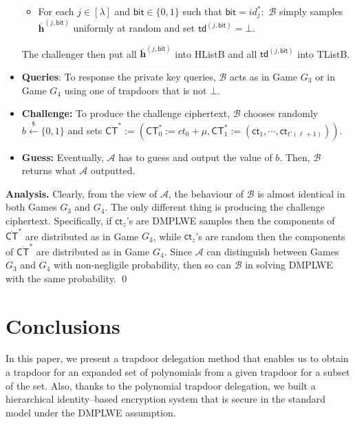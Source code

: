 \documentclass[runningheads]{llncs}
\begin{document}
\begin{itemize}
\begin{itemize}
\item For each $j \in [\lambda]$ and $\textsf{bit}\in\{0,1\}$ such that $\textsf{bit} =  id^*_j:$ $\mathcal{B}$ simply samples $ \overline{\textbf{h}}^{(j,\mathsf{bit})}$ uniformly at random and set $\textsf{td}^{(j,\textsf{bit})}=\bot$.  
 
\end{itemize}
The challenger then put all $ \overline{\textbf{h}}^{(j,\mathsf{bit})}$ into \textsf{HListB} and all $\textsf{td}^{(j,\textsf{bit})}$ into \textsf{TListB}.
\item \textbf{Queries}: To response the private key queries, $\mathcal{B}$ acts as in Game $G_3$ or in Game $G_4$ using one of trapdoors that is not $\bot$.
\item \textbf{Challenge:} To produce the challenge ciphertext, $\mathcal{B}$ chooses randomly $b\xleftarrow[]{\$}\{0,1\}$ and sets $ \overline{\mathsf{CT}}^*:=(\mathsf{CT}^*_0:=ct_0+\mu, \mathsf{CT}^*_1:=(\textsf{ct}_1, \cdots, \textsf{ct}_{t'(\ell+1)})) $.
\item  \textbf{Guess:} Eventually, $\mathcal{A}$ has to guess and output the value of $b$. Then, $\mathcal{B}$ returns what $\mathcal{A}$ outputted. 
\end{itemize}  






\textbf{Analysis. }Clearly, from the view of $\mathcal{A}$, the behaviour of $\mathcal{B}$ is almost identical in both Games $G_3$ and $G_4$. The only different thing is producing the challenge ciphertext. Specifically, if $\textsf{ct}_z$'s are \textsf{DMPLWE} samples then the components of $\overline{\mathsf{CT}}^*$ are distributed as in Game $G_3$, while $\textsf{ct}_z$'s are random then the components of $\overline{\mathsf{CT}}^*$ are distributed as  in Game $G_4$. Since  $\mathcal{A}$ can distinguish between Games $G_3$ and $G_4$ with non-negligile probability, then so can $\mathcal{B}$ in solving \textsf{DMPLWE} with the same probability. \qed

\section{Conclusions} \label{sec5}
In this paper, we present a trapdoor delegation method that enables us to obtain a trapdoor for an expanded set of polynomials from a given trapdoor for a subset of the set. Also, thanks to the polynomial trapdoor delegation, we built a hierarchical identity--based encryption system that is secure in the standard model under the \textsf{DMPLWE} assumption.  
\end{document}
